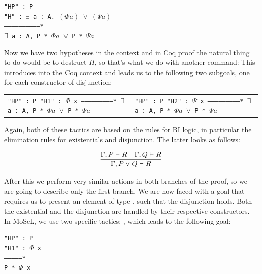 \begin{minipage}[t]{\linewidth}
\texttt{"HP" : P\\
"H" : \(\exists\) a : A. \((\Phi a)\) \(\vee\) \((\Psi a)\)\\
------------------------------*\\
\(\exists\) a : A, P * \(\Phi a\) \(\vee\) P * \(\Psi a\)}
\end{minipage}

Now we have two hypotheses in the context and in Coq proof the natural thing to do would be to destruct \(H\), so that's what we do with another command: \linebreak[4] 
This introduces  into the Coq context and leads us to the following two subgoals, one for each constructor of disjunction:

\begin{minipage}[t]{\linewidth}
\begin{tabular}{l l}
  \parbox[t]{0.5\textwidth}{\texttt{"HP" : P\\
  "H1" : $\Phi$ x\\
  --------------------------*\\
  \(\exists\) a : A, P * \(\Phi a\) \(\vee\) P * \(\Psi a\)}} &
  \parbox[t]{0.5\textwidth}{\texttt{"HP" : P\\
  "H2" : $\Psi$ x\\
  --------------------------*\\
  \(\exists\) a : A, P * \(\Phi a\) \(\vee\) P * \(\Psi a\)}}
\end{tabular}
\end{minipage}

Again, both of these tactics are based on the rules for BI logic, in particular the elimination rules for existentials and disjunction.
The latter looks as follows:

\[\infer{\Gamma, P \vee Q \vdash R}
        {\Gamma, P \vdash R &
         \Gamma, Q \vdash R }\]

After this we perform very similar actions in both branches of the proof, so we are going to describe only the first branch.
We are now faced with a goal that requires us to present an element of type , such that the disjunction holds.
Both the existential and the disjunction are handled by their respective constructors.
In MoSeL, we use two specific tactics: , which leads to the following goal:

\begin{minipage}[t]{\linewidth}
\texttt{"HP" : P\\
"H1" : $\Phi$ x\\
--------------*\\
P * $\Phi$ x}
\end{minipage}

